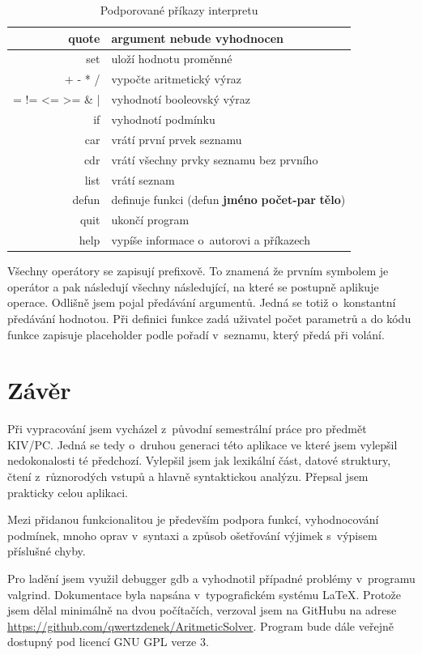 \documentclass[a4paper, 12pt]{article}
\begin{document}
\begin{table}
\centering
\begin{tabular}{|r|l|}
\hline
quote & argument nebude vyhodnocen\\ \hline
set & uloží hodnotu proměnné\\ \hline
+ - * / & vypočte aritmetický výraz\\ \hline
= != \textless{=} \textgreater{=} \& | & vyhodnotí booleovský výraz\\ \hline
if & vyhodnotí podmínku\\ \hline
car & vrátí první prvek seznamu\\ \hline
cdr & vrátí všechny prvky seznamu bez prvního\\ \hline
list & vrátí seznam\\ \hline
defun & definuje funkci (defun \textbf{jméno} \textbf{počet-par} \textbf{tělo})\\ \hline
quit & ukončí program\\ \hline
help & vypíše informace o~autorovi a příkazech\\
\hline
\end{tabular}
\caption{Podporované příkazy interpretu}
\label{tab:prik}
\end{table}

Všechny operátory se zapisují prefixově. To znamená že prvním symbolem je operátor
a pak následují všechny následující, na které se postupně aplikuje operace.
Odlišně jsem pojal předávání argumentů. Jedná se totiž o~konstantní předávání
hodnotou. Při definici funkce zadá uživatel počet parametrů a do kódu
funkce zapisuje placeholder podle pořadí v~seznamu, který předá při volání.

\section{Závěr}
Při vypracování jsem vycházel z~původní semestrální práce pro předmět KIV/PC.
Jedná se tedy o~druhou generaci této aplikace ve které jsem vylepšil nedokonalosti
té předchozí. Vylepšil jsem jak lexikální část, datové struktury, čtení
z~různorodých vstupů a hlavně syntaktickou analýzu. Přepsal jsem prakticky
celou aplikaci.

Mezi přidanou funkcionalitou je především podpora funkcí, vyhodnocování podmínek,
mnoho oprav v~syntaxi a způsob ošetřování výjimek s~výpisem příslušné chyby.

Pro ladění jsem využil debugger \textsf{gdb} a vyhodnotil případné problémy v~programu
\textsf{valgrind}. Dokumentace byla napsána v~typografickém systému
\LaTeX{}. Protože jsem dělal minimálně na dvou počítačích, verzoval jsem
na GitHubu na adrese
\url{https://github.com/qwertzdenek/AritmeticSolver}. Program bude dále
veřejně dostupný pod licencí GNU GPL verze 3.
\end{document}
